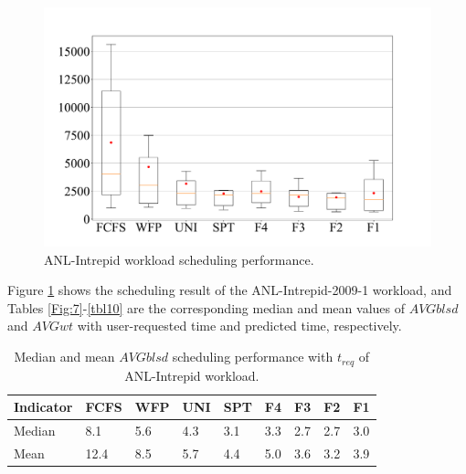 \documentclass[a4paper,fleqn]{cas-sc}
\begin{document}
\begin{figure}[htbp]
{\begin{minipage}[t]{0.44\linewidth}
			\includegraphics[scale=.20]{figs/Fig8c.pdf}
		\end{minipage}
	}%
	\centering
	\caption{ANL-Intrepid workload scheduling performance.} \label{Fig:8}
\end{figure}
Figure \ref{Fig:8} shows the scheduling result of the ANL-Intrepid-2009-1 workload, and Tables \ref{Fig:7}-\ref{tbl10} are the corresponding median and mean values of $A\!V\!Gblsd$ and $A\!V\!Gwt$ with user-requested time and predicted time, respectively.
\begin{table}[width=.62\linewidth,cols=9,pos=h]
	\caption{Median and mean $A\!V\!Gblsd$ scheduling performance with $t_{req}$ of ANL-Intrepid workload.}\label{tbl7}
	\begin{tabular*}{\tblwidth}{@{} LLLLLLLLL@{} }
		\toprule
		Indicator & FCFS & WFP & UNI & SPT & F4 & F3 & F2 & F1\\
		\midrule
		Median & 8.1 &	5.6 &	4.3 &	3.1 &	3.3 &	2.7 &	2.7 &	3.0 \\
		Mean & 12.4 &	8.5 &	5.7 &	4.4 & 	5.0 &	3.6 &	3.2 &	3.9\\
		\bottomrule
	\end{tabular*}
\end{table}
\end{document}
